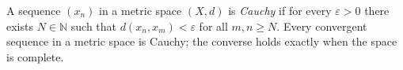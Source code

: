 
A sequence $(x_n)$ in a metric space $(X,d)$ is \emph{Cauchy} if for every $\varepsilon>0$ there exists $N\in\mathbb N$ such that $d(x_n,x_m)<\varepsilon$ for all $m,n\ge N$. Every convergent sequence in a metric space is Cauchy; the converse holds exactly when the space is complete.
